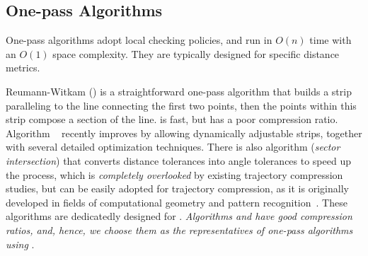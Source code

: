 \subsection{One-pass Algorithms}

One-pass algorithms adopt local checking policies, and run in $O(n)$ time with an $O(1)$ space complexity. They are typically designed for specific distance metrics.

Reumann-Witkam (\rwa) \cite{Reumann:Strip} is a straightforward one-pass algorithm that builds a strip paralleling to the line connecting the first two points, then the points within this strip compose a section of the line.  \rwa is fast, but has a poor compression ratio.
Algorithm \operb~\cite{Lin:Operb} recently improves \rwa  by allowing dynamically adjustable strips, together with several detailed optimization techniques.
%
There is also algorithm \siped (\emph{sector intersection}) that converts \ped distance tolerances into angle tolerances to speed up the process, which is {\em completely overlooked} by existing trajectory compression studies,  but can be easily adopted for trajectory compression, as it is originally developed in fields of computational geometry and pattern recognition~\cite{Williams:Longest,Sklansky:Cone,Dunham:Cone, Zhao:Sleeve}.
%
These algorithms are dedicatedly designed  for \ped. {\em Algorithms \operb and \siped have good compression ratios, and, hence, we choose them as the representatives of  one-pass algorithms using \ped}.


